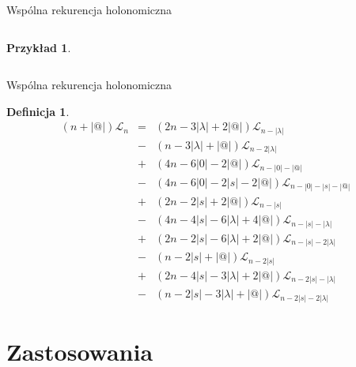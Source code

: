 \documentclass[final]{beamer}
\theoremstyle{bluetheorem}
\theoremstyle{bluetheorem}
\newtheorem{mydefinition}[mytheorem]{Definicja}
\theoremstyle{greentheorem}
\newtheorem{myexample}[mytheorem]{Przykład}
\begin{document}
\begin{frame}{Wspólna rekurencja holonomiczna}
\begin{columns}
\begin{myexample}
\begin{center}
            \end{center}
        \end{myexample}
    \end{columns}
\end{frame}

\begin{frame}{Wspólna rekurencja holonomiczna}
    \begin{mydefinition}
        \[\begin{array}{rcl}
                (n + |@|)\mathcal{L}_n &=& (2n - 3|\lambda| + 2|@|)\mathcal{L}_{n -|\lambda|}\\
                                       &-& (n - 3|\lambda| + |@|)\mathcal{L}_{n-2|\lambda|}\\
                                       &+& (4n - 6|0| - 2|@|)\mathcal{L}_{n-|0|-|@|}\\
                                       &-& (4n - 6|0| - 2|s| - 2|@|)\mathcal{L}_{n-|0|-|s|-|@|}\\
                                       &+& (2n - 2|s| + 2|@|)\mathcal{L}_{n-|s|}\\
                                       &-& (4n - 4|s| - 6|\lambda| + 4|@|)\mathcal{L}_{n-|s|-|\lambda|}\\
                                       &+& (2n - 2|s| - 6|\lambda| + 2|@|)\mathcal{L}_{n-|s|-2|\lambda|}\\
                                       &-& (n - 2|s| + |@|)\mathcal{L}_{n-2|s|}\\
                                       &+& (2n - 4|s| - 3|\lambda| + 2|@|)\mathcal{L}_{n-2|s|-|\lambda|}\\
                                       &-& (n - 2|s| - 3|\lambda| + |@|)\mathcal{L}_{n-2|s|-2|\lambda|}
        \end{array}\]
    \end{mydefinition}
\end{frame}

\section{Zastosowania}
\end{document}
